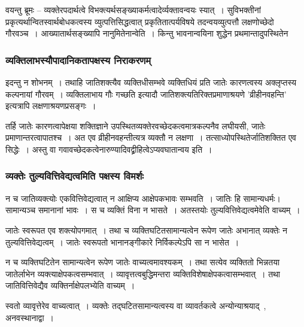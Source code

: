 				\begin{small}
				
					वयन्तु ब्रूमः – व्यक्तेरपदार्थत्वे विभक्त्यर्थसङ्ख्याकर्मत्वादेर्व्यक्तावन्वयः स्यात्~। सुविभक्तीनां प्रकृत्यर्थान्वितस्वार्थबोधकत्वस्य व्युत्पत्तिसिद्धत्वात् प्रकृतितात्पर्यविषये तदन्वयव्युत्पत्तौ लक्षणोच्छेदो गौरवञ्च~। आख्यातार्थसङ्ख्यापि नानुमितेनान्वेति~। किन्तु भावनान्वयिना शुद्धेन प्रथमान्तादुपस्थितेन
				\end{small}

			\subsubsection{व्यक्तिलाभस्यौपादानिकतापक्षस्य निराकरणम्}
				
				इदन्तु न शोभनम्~। तथाहि जातिशक्त्यैव व्यक्तिधीसम्भवे व्यक्तिधियं प्रति जातेः कारणत्वस्य अक्लृप्तस्य कल्पनायां गौरवम्~। व्यक्तिलाभाय गौः गच्छति इत्यादौ जातिशक्त्यतिरिक्तप्रमाणाश्रयणे 'व्रीहीनवहन्ति' इत्यत्रापि लक्षणाश्रयणप्रसङ्गः~।

				\begin{small}

					तर्हि जातेः कारणत्वापेक्षया शक्तिज्ञाने उपस्थितव्यक्तेरवच्छेदकत्वमात्रकल्पनैव लघीयसी, जातेः प्रमाणान्तरत्वापातश्च~। अत एव व्रीहीनवहन्तीत्यत्र व्यक्तौ न लक्षणा~। तत्साध्योपस्थितेर्जातिशक्तित एव सिद्धेः~। अस्तु वा गवावच्छेदकत्वेनारुण्यादिवद्व्रीहित्वेऽप्यवघातान्वय इति~।
				\end{small}

			\subsubsection{व्यक्तेः तुल्यवित्तिवेद्यत्वमिति पक्षस्य विमर्शः} 

				न च जातिव्यक्त्योः एकवित्तिवेद्यत्वात् न आक्षिप्य आक्षेपकभावः सम्भवति~। जातिः हि सामान्यधर्मः। सामान्यञ्च समानानां भावः~। स च व्यक्तिं विना न भासते~। अतस्तयोः तुल्यवित्तिवेद्यत्वमेवेति वाच्यम्~।

				जातेः स्वरूपत एव शक्त्योपगमात्~। तथा च व्यक्तिघटितसामान्यत्वेन रूपेण जातेः अभानात् व्यक्तेः न तुल्यवित्तिवेद्यत्वम्~। जातेः स्वरूपतो भानानङ्गीकारे निर्विकल्पेऽपि सा न भासेत~। 

				न च व्यक्तिघटितेन सामान्यत्वेन रूपेण जातेः वाच्यत्वमावश्यकम्~। तथा सत्येव व्यक्तितो भिन्नतया जातेर्लाभेन व्यक्त्याक्षेपकत्वसम्भवात्~। व्यावृत्तत्वबुद्धिमन्तरा व्यक्तिविशेषाक्षेपकत्वासम्भवात्~। तथा जातिवित्तिवेद्यैव व्यक्तिर्नाक्षेपलभ्येति वाच्यम्~। 

				स्वतो व्यावृत्तेरेव वाच्यत्वात्~। व्यक्तेः तद्घटितसामान्यत्वस्य वा व्यावर्तकत्वे अन्योन्याश्रयाद्~, अनवस्थानाद्वा~।

